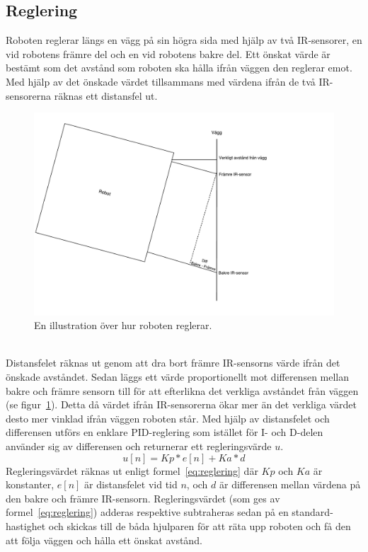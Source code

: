 \documentclass{article}
\begin{document}
\subsection{Reglering}
\label{sec:reglering}
Roboten reglerar längs en vägg på sin högra sida med hjälp av två IR-sensorer, en vid robotens främre del och en vid robotens bakre del. Ett önskat värde är bestämt som det avstånd som roboten ska hålla ifrån väggen den reglerar emot. Med hjälp av det önskade värdet tillsammans med värdena ifrån de två IR-sensorerna räknas ett distansfel ut. 

\begin{figure}[H]
\centering
\includegraphics[scale=0.4]{Reglering}
\caption{En illustration över hur roboten reglerar.}
\label{fig:reglering}
\end{figure}
\ \\
\newline
Distansfelet räknas ut genom att dra bort främre IR-sensorns värde ifrån det önskade avståndet. Sedan läggs ett värde proportionellt mot differensen mellan bakre och främre sensorn till för att efterlikna det verkliga avståndet från väggen (se figur~\ref{fig:reglering}). Detta då värdet ifrån IR-sensorerna ökar mer än det verkliga värdet desto mer vinklad ifrån väggen roboten står.\newline\newline
Med hjälp av distansfelet och differensen utförs en enklare PID-reglering som istället för I- och D-delen använder sig av differensen och returnerar ett regleringsvärde $u$.
\begin{equation}
u[n] = Kp * e[n] + Ka * d
\label{eq:reglering}
\end{equation}  
Regleringsvärdet räknas ut enligt formel~\ref{eq:reglering} där $Kp$ och $Ka$ är konstanter, $e[n]$ är distansfelet vid tid $n$, och $d$ är differensen mellan värdena på den bakre och främre IR-sensorn. Regleringsvärdet (som ges av formel~\ref{eq:reglering}) adderas respektive subtraheras sedan på en standard-hastighet och skickas till de båda hjulparen för att räta upp roboten och få den att följa väggen och hålla ett önskat avstånd. 
\end{document}
